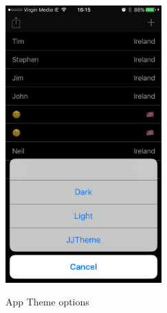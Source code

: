 \begin{figure}[!h]
    \caption{App Theme options}
    \centering
    \includegraphics[width=60mm]{images/testing/themes}
    \label{fig:app-themes-options}
\end{figure} 

